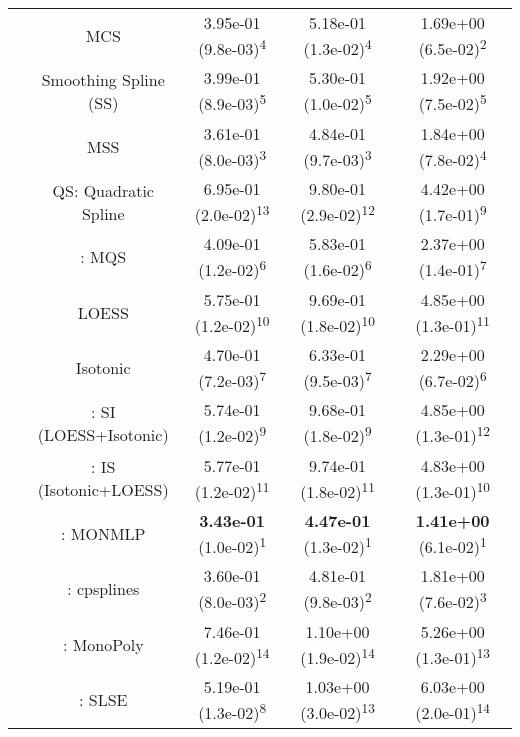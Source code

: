 \begin{tabular}{ccccc}
&MCS& 3.95e-01 (9.8e-03)\textsuperscript{4}& 5.18e-01 (1.3e-02)\textsuperscript{4}& 1.69e+00 (6.5e-02)\textsuperscript{2}\tabularnewline
&Smoothing Spline (SS)& 3.99e-01 (8.9e-03)\textsuperscript{5}& 5.30e-01 (1.0e-02)\textsuperscript{5}& 1.92e+00 (7.5e-02)\textsuperscript{5}\tabularnewline
&MSS& 3.61e-01 (8.0e-03)\textsuperscript{3}& 4.84e-01 (9.7e-03)\textsuperscript{3}& 1.84e+00 (7.8e-02)\textsuperscript{4}\tabularnewline
&QS: Quadratic Spline& 6.95e-01 (2.0e-02)\textsuperscript{13}& 9.80e-01 (2.9e-02)\textsuperscript{12}& 4.42e+00 (1.7e-01)\textsuperscript{9}\tabularnewline
&\textcite{heMonotoneBsplineSmoothing1998}: MQS& 4.09e-01 (1.2e-02)\textsuperscript{6}& 5.83e-01 (1.6e-02)\textsuperscript{6}& 2.37e+00 (1.4e-01)\textsuperscript{7}\tabularnewline
&LOESS& 5.75e-01 (1.2e-02)\textsuperscript{10}& 9.69e-01 (1.8e-02)\textsuperscript{10}& 4.85e+00 (1.3e-01)\textsuperscript{11}\tabularnewline
&Isotonic& 4.70e-01 (7.2e-03)\textsuperscript{7}& 6.33e-01 (9.5e-03)\textsuperscript{7}& 2.29e+00 (6.7e-02)\textsuperscript{6}\tabularnewline
&\textcite{mammenEstimatingSmoothMonotone1991}: SI (LOESS+Isotonic)& 5.74e-01 (1.2e-02)\textsuperscript{9}& 9.68e-01 (1.8e-02)\textsuperscript{9}& 4.85e+00 (1.3e-01)\textsuperscript{12}\tabularnewline
&\textcite{mammenEstimatingSmoothMonotone1991}: IS (Isotonic+LOESS)& 5.77e-01 (1.2e-02)\textsuperscript{11}& 9.74e-01 (1.8e-02)\textsuperscript{11}& 4.83e+00 (1.3e-01)\textsuperscript{10}\tabularnewline
&\textcite{cannonMonmlpMultilayerPerceptron2017}: MONMLP& \textbf{3.43e-01} (1.0e-02)\textsuperscript{1}& \textbf{4.47e-01} (1.3e-02)\textsuperscript{1}& \textbf{1.41e+00} (6.1e-02)\textsuperscript{1}\tabularnewline
&\textcite{navarro-garciaConstrainedSmoothingOutofrange2023}: cpsplines& 3.60e-01 (8.0e-03)\textsuperscript{2}& 4.81e-01 (9.8e-03)\textsuperscript{2}& 1.81e+00 (7.6e-02)\textsuperscript{3}\tabularnewline
&\textcite{murrayFastFlexibleMethods2016a}: MonoPoly& 7.46e-01 (1.2e-02)\textsuperscript{14}& 1.10e+00 (1.9e-02)\textsuperscript{14}& 5.26e+00 (1.3e-01)\textsuperscript{13}\tabularnewline
&\textcite{groeneboomConfidenceIntervalsMonotone2023}: SLSE& 5.19e-01 (1.3e-02)\textsuperscript{8}& 1.03e+00 (3.0e-02)\textsuperscript{13}& 6.03e+00 (2.0e-01)\textsuperscript{14}\tabularnewline
\bottomrule
\end{tabular}
